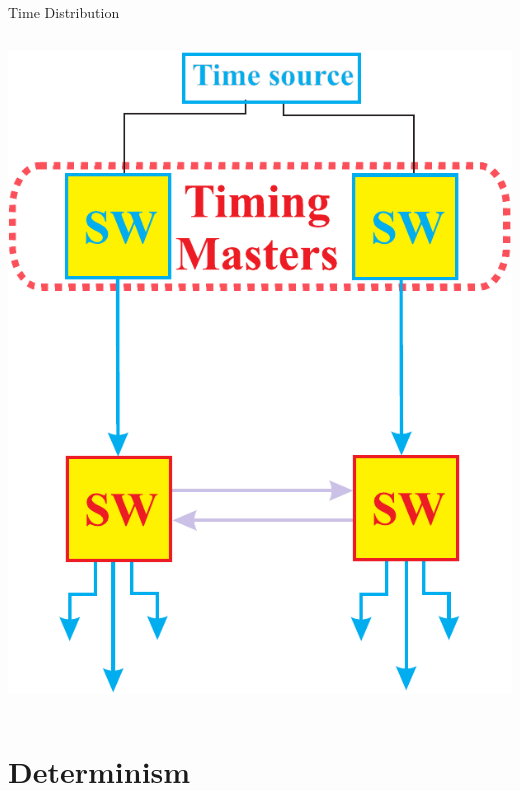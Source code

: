 \documentclass[compress,red]{beamer}
\begin{document}
\begin{frame}{Time Distribution}
\begin{columns}[c]
      \begin{center}
	\includegraphics[width=1.1\textwidth]{robustness/WRPTPmodif_2.pdf}
      \end{center}  
    

  \end{columns}

\end{frame}
\section{Determinism}
\end{document}
